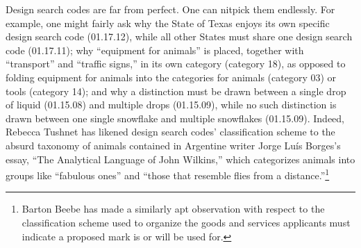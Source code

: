 \documentclass[letterpaper, 11pt, oneside]{article}
\begin{document}
Design search codes are far from perfect. One can nitpick them endlessly. For example, one might fairly ask why the State of Texas enjoys its own specific design search code (01.17.12), while all other States must share one design search code (01.17.11); why ``equipment for animals'' is placed, together with ``transport'' and ``traffic signs,'' in its own category (category 18), as opposed to folding equipment for animals into the categories for animals (category 03) or tools (category 14); and why a distinction must be drawn between a single drop of liquid (01.15.08) and multiple drops (01.15.09), while no such distinction is drawn between one single snowflake and multiple snowflakes (01.15.09). Indeed, Rebecca Tushnet has likened design search codes' classification scheme to the absurd taxonomy of animals contained in Argentine writer Jorge Luís Borges's essay, ``The Analytical Language of John Wilkins,'' which categorizes animals into groups like ``fabulous ones'' and ``those that resemble flies from a distance.''\footnote{Barton Beebe has made a similarly apt observation with respect to the classification scheme used to organize the goods and services applicants must indicate a proposed mark is or will be used for.}
\end{document}
